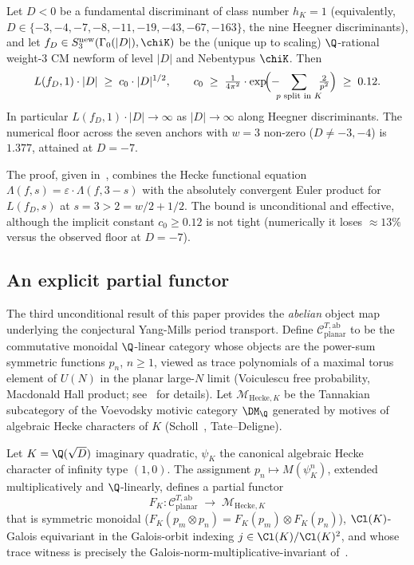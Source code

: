 \begin{theorem}\label{thm:T2}
Let $D < 0$ be a fundamental discriminant of class number $h_K = 1$
(equivalently, $D \in \{-3, -4, -7, -8, -11, -19, -43, -67,
-163\}$, the nine Heegner discriminants), and let $f_D \in
S_3^{\mathrm{new}}(\Gamma_0(|D|), \chiK)$ be the (unique up to
scaling) $\Q$-rational weight-$3$ CM newform of level $|D|$ and
Nebentypus $\chiK$. Then
\begin{equation}\label{eq:T2-conclusion}
L(f_D, 1) \cdot |D| \;\geq\; c_0 \cdot |D|^{1/2},
\qquad c_0 \;\geq\; \tfrac{1}{4\pi^2} \cdot \exp\!\Bigl(-\!\!\!\sum_{p\text{ split in }K}\!\!\!\tfrac{2}{p^2}\Bigr)
\;\geq\; 0.12.
\end{equation}
In particular $L(f_D, 1) \cdot |D| \to \infty$ as $|D| \to
\infty$ along Heegner discriminants. The numerical floor across
the seven anchors with $w = 3$ non-zero ($D \neq -3, -4$) is
$1.377$, attained at $D = -7$.
\end{theorem}

The proof, given in~, combines the Hecke
functional equation $\Lambda(f, s) = \varepsilon \cdot
\Lambda(f, 3 - s)$ with the absolutely convergent Euler product
for $L(f_D, s)$ at $s = 3 > 2 = w/2 + 1/2$. The bound is
unconditional and effective, although the implicit constant
$c_0 \geq 0.12$ is not tight (numerically it loses $\approx 13\%$
versus the observed floor at $D = -7$).

\subsection{An explicit partial functor}\label{ss:T3-statement}

The third unconditional result of this paper provides the
\emph{abelian} object map underlying the conjectural Yang-Mills
period transport. Define $\mathcal{C}_{\mathrm{planar}}^{T,\mathrm{ab}}$
to be the commutative monoidal $\Q$-linear category whose objects
are the power-sum symmetric functions $p_n$, $n \geq 1$, viewed as
trace polynomials of a maximal torus element of $U(N)$ in the
planar large-$N$ limit (Voiculescu free probability, Macdonald
Hall product; see~ for details). Let
$\mathcal{M}_{\mathrm{Hecke}, K}$ be the Tannakian subcategory of
the Voevodsky motivic category $\DM_\Q$ generated by motives of
algebraic Hecke characters of $K$
(Scholl~\cite{Scholl1990}, Tate--Deligne).

\begin{theorem}\label{thm:T3-intro}
Let $K = \Q(\sqrt{D})$ imaginary quadratic, $\psi_K$ the canonical
algebraic Hecke character of infinity type $(1, 0)$. The
assignment $p_n \mapsto M(\psi_K^n)$, extended multiplicatively
and $\Q$-linearly, defines a partial functor
\[
F_K \colon \mathcal{C}_{\mathrm{planar}}^{T,\mathrm{ab}}
\;\longrightarrow\; \mathcal{M}_{\mathrm{Hecke}, K}
\]
that is symmetric monoidal
($F_K(p_m \otimes p_n) = F_K(p_m) \otimes F_K(p_n)$), $\Cl(K)$-Galois
equivariant in the Galois-orbit indexing $j \in \Cl(K)/\Cl(K)^2$,
and whose trace witness is precisely the
Galois-norm-multiplicative-invariant of~.
\end{theorem}

